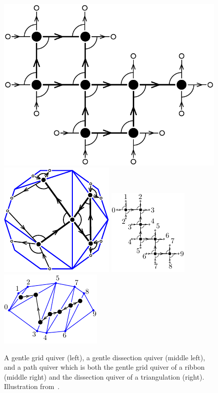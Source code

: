 \documentclass{amsart}
\theoremstyle{definition}
\begin{document}
\begin{figure}[h]
	\capstart
	\centerline{\includegraphics[scale=.35]{gridQuiver} \quad \includegraphics[scale=.8]{dissectionQuiver} \quad \includegraphics[scale=1.2]{bijectionAssociahedronGrid} \quad \includegraphics[scale=1.2]{bijectionAssociahedronDissection}}
	\caption{A gentle grid quiver (left), a gentle dissection quiver (middle left), and a path quiver which is both the gentle grid quiver of a ribbon (middle right) and the dissection quiver of a triangulation (right). Illustration from~\cite{PaluPilaudPlamondon-nonkissing}.}
	\label{fig:dissectionGridQuivers}
\end{figure}
\end{document}
